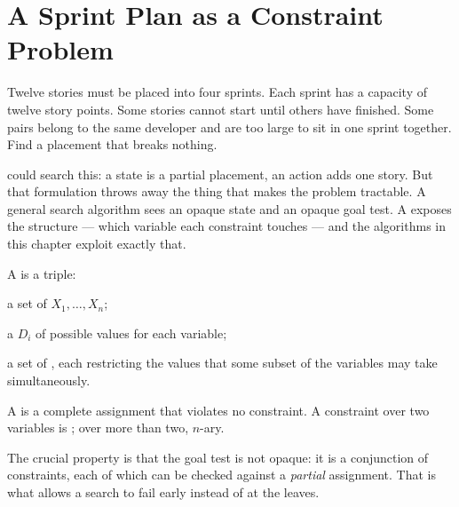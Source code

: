 \section{A Sprint Plan as a Constraint Problem}

Twelve stories must be placed into four sprints. Each sprint has a capacity of
twelve story points. Some stories cannot start until others have finished. Some
pairs belong to the same developer and are too large to sit in one sprint
together. Find a placement that breaks nothing.

 could search this: a state is a partial placement, an action
adds one story. But that formulation throws away the thing that makes the problem
tractable. A general search algorithm sees an opaque state and an opaque goal test.
A  exposes the structure --- which variable
each constraint touches --- and the algorithms in this chapter exploit exactly that.

\begin{definitionbox}
A  is a triple:
\begin{tight}
  \item a set of  $X_{1}, \ldots, X_{n}$;
  \item a  $D_{i}$ of possible values for each variable;
  \item a set of , each restricting the values that some subset
        of the variables may take simultaneously.
\end{tight}
A  is a complete assignment that violates no constraint. A
constraint over two variables is ; over more than two, $n$-ary.

The crucial property is that the goal test is not opaque: it is a conjunction of
constraints, each of which can be checked against a \emph{partial} assignment. That
is what allows a search to fail early instead of at the leaves.
\end{definitionbox}

